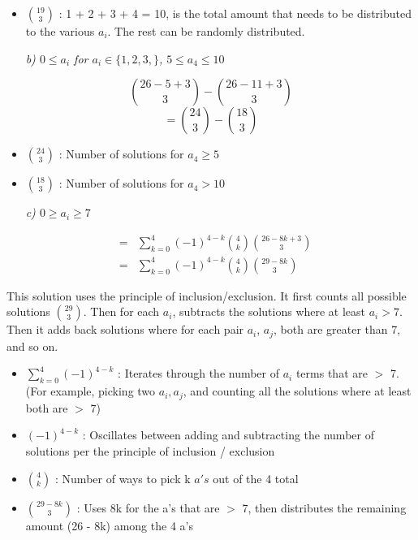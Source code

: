 \documentclass[12pt, letterpaper]{article}
\begin{document}
\begin{itemize}
    \item \( {19 \choose 3} \) : 1 + 2 + 3 + 4 = 10, is the total amount that needs to be distributed to the various \(a_i\). The rest can be randomly distributed. 
\end{itemize} 


\-\ \newline
\-\ \it{ b)}
\( 0 \leq a_i\) for  \(a_i \in \{ 1, 2, 3, \}  \),
\( 5 \leq a_4 \leq 10\)

\[ {26 - 5 + 3 \choose 3} - {26 - 11 + 3 \choose 3 }\]
\[ = {24 \choose 3} - {18 \choose 3 }\]

\begin{itemize}
    \item \( {24 \choose 3} \) : Number of solutions for \(a_4 \geq 5\)
    \item \( {18 \choose 3 } \) : Number of solutions for \(a_4 > 10\)
\end{itemize} 

\-\ \newline
\-\ \it{ c) \( 0 \geq a_i \geq 7 \) }

\begin{eqnarray}
    &=& \sum_{k=0}^{4}(-1)^{4-k} {4 \choose k} {26 - 8k + 3 \choose 3} \\
    &=& \sum_{k=0}^{4}(-1)^{4-k} {4 \choose k} {29 - 8k \choose 3}
\end{eqnarray}


\textnormal{This solution uses the principle of inclusion/exclusion. It first counts all possible solutions \({29 \choose 3}\). Then for each \(a_i\), subtracts the solutions where at least \(a_i > 7\). Then it adds back solutions where for each pair \(a_i\), \(a_j\), both are greater than 7, and so on.}

\begin{itemize}
    \item \( \sum_{k=0}^{4}(-1)^{4-k} \) : Iterates through the number of \(a_i\) terms that are \(>\) 7. (For example, picking two \(a_i, a_j\), and counting all the solutions where at least both are \(>\) 7)
    \item \( {(-1)^{4-k} } \) : Oscillates between adding and subtracting the number of solutions per the principle of inclusion / exclusion
    \item \( {4 \choose k} \) : Number of ways to pick k \(a's\) out of the 4 total
    \item \( {29 - 8k \choose 3} \) : Uses 8k for the a's that are \(>\) 7, then distributes the remaining amount (26 - 8k) among the 4 a's
\end{itemize} 
\end{document}
